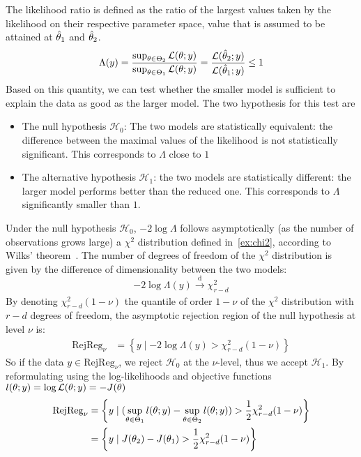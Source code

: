 \documentclass[../../Main_ManuscritThese.tex]{subfiles}
\begin{document}
The likelihood ratio is defined as the ratio of the largest values taken by the likelihood on their respective parameter space, value that is assumed to be attained at $\hat{\theta}_1$ and $\hat{\theta}_2$.
\begin{equation}
  \label{eq:def_lik_ratio}
  \Lambda(y) = \frac{\sup_{\theta \in \Theta_2} \mathcal{L}(\theta ; y)}{\sup_{\theta \in \Theta_1} \mathcal{L}(\theta ; y)} = \frac{\mathcal{L}(\hat{\theta}_2 ; y)}{\mathcal{L}(\hat{\theta}_1 ; y)} \leq 1
\end{equation}
Based on this quantity, we can test whether the smaller model is sufficient to explain the data as good as the larger model. The two hypothesis for this test are
\begin{itemize}
\item The null hypothesis $\mathcal{H}_0$: The two models are statistically equivalent: the difference between the maximal values of the likelihood is not statistically significant. This corresponds to $\Lambda$ close to $1$
\item  The alternative hypothesis $\mathcal{H}_1$: the two models are statistically different: the larger model performs better than the reduced one. This corresponds to $\Lambda$ significantly smaller than $1$.
\end{itemize}
Under the null hypothesis  $\mathcal{H}_0$, $-2 \log \Lambda$ follows asymptotically (as the number of observations grows large) a $\chi^2$ distribution defined in~\cref{ex:chi2}, according to Wilks' theorem~\citep{wilks_large-sample_1938}. The number of degrees of freedom of the $\chi^2$ distribution is given by the difference of dimensionality between the two models:
\begin{equation}
  \label{eq:deviance_asymptotics}
  - 2 \log \Lambda(y) \xrightarrow[]{\mathrm{d}} \chi^2_{r-d}
\end{equation}
By denoting $\chi^2_{r-d}(1-\nu)$ the quantile of order $1-\nu$ of the $\chi^2$ distribution with $r-d$ degrees of freedom, the asymptotic rejection region of the null hypothesis at level $\nu$ is:
\begin{align}
  \mathrm{RejReg}_{\nu} &= \left\{y \mid -2 \log \Lambda(y) > \chi^2_{r-d}(1-\nu) \right\} \label{eq:LRT_rej_reg}
\end{align}
So if the data $y \in \mathrm{RejReg}_{\nu}$, we reject $\mathcal{H}_0$ at the $\nu$-level, thus we accept $\mathcal{H}_1$.
By reformulating using the log-likelihoods and objective functions $l(\theta;y) = \log \mathcal{L}(\theta;y) = - J(\theta)$
\begin{align}
  \mathrm{RejReg}_{\nu} &= \left\{ y \mid (\sup_{\theta\in\Theta_1} l(\theta;y) - \sup_{\theta\in\Theta_2} l(\theta;y)) > \frac12 \chi^2_{r-d}(1-\nu) \right\} \\
                             &= \left\{ y \mid J(\theta_2) - J(\theta_1) >  \frac12 \chi^2_{r-d}(1-\nu) \right\} \label{eq:rejreg_chi2}
\end{align}
\end{document}
